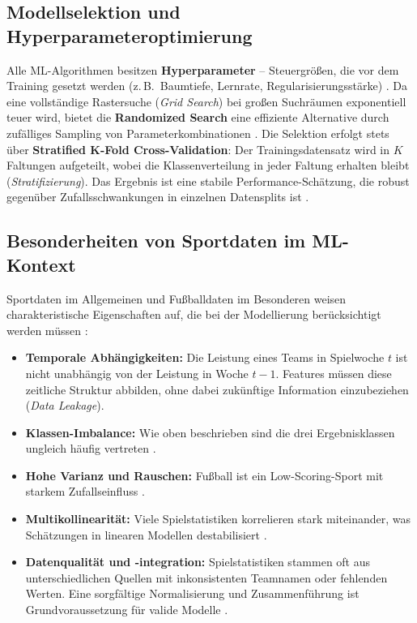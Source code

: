 \subsection{Modellselektion und Hyperparameteroptimierung}

Alle ML-Algorithmen besitzen \textbf{Hyperparameter} -- Steuergrößen,
die vor dem Training gesetzt werden (z.\,B.\ Baumtiefe, Lernrate,
Regularisierungsstärke) \cite{JamesEtAl2021}. Da eine vollständige
Rastersuche (\textit{Grid Search}) bei großen Suchräumen exponentiell
teuer wird, bietet die \textbf{Randomized Search} eine effiziente Alternative
durch zufälliges Sampling von Parameterkombinationen \cite{JamesEtAl2021}.
Die Selektion erfolgt stets über \textbf{Stratified K-Fold Cross-Validation}:
Der Trainingsdatensatz wird in $K$ Faltungen aufgeteilt, wobei die
Klassenverteilung in jeder Faltung erhalten bleibt (\textit{Stratifizierung}).
Das Ergebnis ist eine stabile Performance-Schätzung, die robust gegenüber
Zufallsschwankungen in einzelnen Datensplits ist \cite{JamesEtAl2021}.

\subsection{Besonderheiten von Sportdaten im ML-Kontext}

Sportdaten im Allgemeinen und Fußballdaten im Besonderen weisen
charakteristische Eigenschaften auf, die bei der Modellierung berücksichtigt
werden müssen \cite{BunkerThabtah2019,Sumpter2016}:

\begin{itemize}
    \item \textbf{Temporale Abhängigkeiten:} Die Leistung eines Teams in
          Spielwoche $t$ ist nicht unabhängig von der Leistung in Woche
          $t-1$. Features müssen diese zeitliche Struktur abbilden, ohne
          dabei zukünftige Information einzubeziehen (\textit{Data Leakage}).
    \item \textbf{Klassen-Imbalance:} Wie oben beschrieben sind die drei
          Ergebnisklassen ungleich häufig vertreten \cite{HeGarcia2009}.
    \item \textbf{Hohe Varianz und Rauschen:} Fußball ist ein
          Low-Scoring-Sport mit starkem Zufallseinfluss \cite{DobsonGoddard2011}.
    \item \textbf{Multikollinearität:} Viele Spielstatistiken korrelieren
          stark miteinander, was Schätzungen in linearen Modellen
          destabilisiert \cite{JamesEtAl2021}.
    \item \textbf{Datenqualität und -integration:} Spielstatistiken
          stammen oft aus unterschiedlichen Quellen mit inkonsistenten
          Teamnamen oder fehlenden Werten. Eine sorgfältige Normalisierung
          und Zusammenführung ist Grundvoraussetzung für valide Modelle
          \cite{BunkerThabtah2019}.
\end{itemize}

